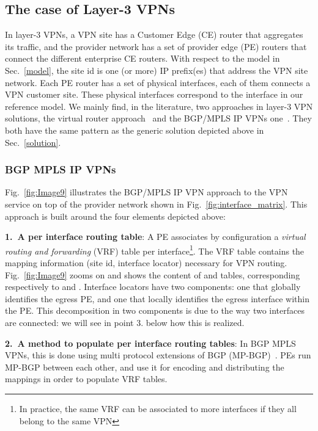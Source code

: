 \subsection{The case of Layer-3 VPNs}
In layer-3 VPNs, a VPN site has a Customer Edge (CE) router that aggregates its traffic, and the provider network has a set of provider edge (PE) routers that connect the different enterprise CE routers. With respect to the model in Sec.~\ref{model}, the site id is one (or more) IP prefix(es) that address the VPN site network. Each PE router has a set of physical interfaces, each of them connects a VPN customer site.
These physical interfaces correspond to the interface in our reference model. We mainly find, in the literature, two approaches in layer-3 VPN solutions, the virtual router approach~\cite{VR:draft} and the BGP/MPLS IP VPNs one~\cite{rfc:4364}. They both have the same pattern as the generic solution depicted above in Sec.~\ref{solution}.

\subsubsection{BGP MPLS IP VPNs}\label{bgp_mpls}
Fig.~\ref{fig:Image9} illustrates the BGP/MPLS IP VPN approach to the VPN service on top of the provider network shown in Fig.~\ref{fig:interface_matrix}. This approach is built around the four elements depicted above:


	\vspace{1mm}\noindent \textbf{1.~A per interface routing table}: A PE associates by configuration a \emph{virtual routing and forwarding} (VRF) table per interface\footnote{In practice, the same VRF can be associated to more interfaces if they all belong to the same VPN}. The VRF table contains the mapping information (site id, interface locator) necessary for VPN routing. Fig.~\ref{fig:Image9} zooms on  and shows the content of  and  tables, corresponding respectively to  and . 
Interface locators have two components: one that globally identifies the egress PE, and one that locally identifies the egress interface within the PE. This decomposition in two components is due to the way two interfaces are connected: we will see in point 3. below how this is realized. 


	\vspace{1mm}\noindent \textbf{2.~A method to populate per interface routing tables}: In BGP MPLS VPNs, this is done using multi protocol extensions of BGP (MP-BGP)~\cite{mpbgp-rfc4760}. 
PEs run MP-BGP between each other, and use it for encoding and distributing the mappings in order to populate VRF tables.  
	
